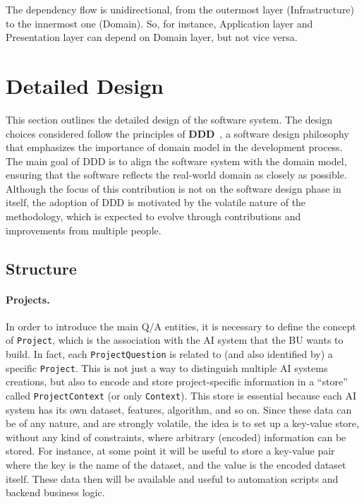 \documentclass[12pt,a4paper,openright,twoside]{book}
\begin{document}
% 
The dependency flow is unidirectional, from the outermost layer (Infrastructure) to the innermost one (Domain).
%
So, for instance, Application layer and Presentation layer can depend on Domain layer, but not vice versa.
%

\section{Detailed Design}

This section outlines the detailed design of the software system.
%
The design choices considered follow the principles of \textbf{\acf{DDD}}~\cite{millett2015ddd}, a software design philosophy that emphasizes the importance of domain model in the development process.
%
The main goal of \ac{DDD} is to align the software system with the domain model, ensuring that the software reflects the real-world domain as closely as possible.
%
Although the focus of this contribution is not on the software design phase in itself, the adoption of \ac{DDD} is motivated by the volatile nature of the methodology, which is expected to evolve through contributions and improvements from multiple people.

\subsection{Structure}

\paragraph{Projects.}
In order to introduce the main \ac{Q/A} entities, it is necessary to define the concept of \texttt{Project}, which is the association with the \ac{AI} system that the \ac{BU} wants to build.
%
In fact, each \texttt{ProjectQuestion} is related to (and also identified by) a specific \texttt{Project}.
%
This is not just a way to distinguish multiple AI systems creations, but also to encode and store project-specific information in a ``store'' called \texttt{ProjectContext} (or only \texttt{Context}).
%
This store is essential because each \ac{AI} system has its own dataset, features, algorithm, and so on.
%
Since these data can be of any nature, and are strongly volatile, the idea is to set up a key-value store, without any kind of constraints, where arbitrary (encoded) information can be stored.
%
For instance, at some point it will be useful to store a key-value pair where the key is the name of the dataset, and the value is the encoded dataset itself.
%
These data then will be available and useful to automation scripts and backend business logic.
\end{document}
